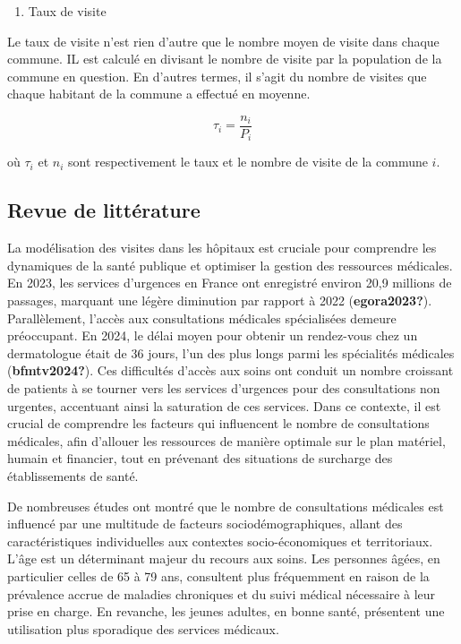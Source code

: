 \documentclass[
]{article}
\providecommand{\tightlist}{%
  \setlength{\itemsep}{0pt}\setlength{\parskip}{0pt}}
\begin{document}
\begin{enumerate}
\def\labelenumi{\arabic{enumi}.}
\setcounter{enumi}{1}
\tightlist
\item
  Taux de visite
\end{enumerate}

Le taux de visite n'est rien d'autre que le nombre moyen de visite dans
chaque commune. IL est calculé en divisant le nombre de visite par la
population de la commune en question. En d'autres termes, il s'agit du
nombre de visites que chaque habitant de la commune a effectué en
moyenne.

\[\tau_i = \frac{n_i}{P_i}\]

où \(\tau_i\) et \(n_i\) sont respectivement le taux et le nombre de
visite de la commune \(i\).

\subsection{Revue de littérature}\label{revue-de-littuxe9rature}

La modélisation des visites dans les hôpitaux est cruciale pour
comprendre les dynamiques de la santé publique et optimiser la gestion
des ressources médicales. En 2023, les services d'urgences en France ont
enregistré environ 20,9 millions de passages, marquant une légère
diminution par rapport à 2022 (\textbf{egora2023?}). Parallèlement,
l'accès aux consultations médicales spécialisées demeure préoccupant. En
2024, le délai moyen pour obtenir un rendez-vous chez un dermatologue
était de 36 jours, l'un des plus longs parmi les spécialités médicales
(\textbf{bfmtv2024?}). Ces difficultés d'accès aux soins ont conduit un
nombre croissant de patients à se tourner vers les services d'urgences
pour des consultations non urgentes, accentuant ainsi la saturation de
ces services. Dans ce contexte, il est crucial de comprendre les
facteurs qui influencent le nombre de consultations médicales, afin
d'allouer les ressources de manière optimale sur le plan matériel,
humain et financier, tout en prévenant des situations de surcharge des
établissements de santé.

De nombreuses études ont montré que le nombre de consultations médicales
est influencé par une multitude de facteurs sociodémographiques, allant
des caractéristiques individuelles aux contextes socio-économiques et
territoriaux. L'âge est un déterminant majeur du recours aux soins. Les
personnes âgées, en particulier celles de 65 à 79 ans, consultent plus
fréquemment en raison de la prévalence accrue de maladies chroniques et
du suivi médical nécessaire à leur prise en charge. En revanche, les
jeunes adultes, en bonne santé, présentent une utilisation plus
sporadique des services médicaux.
\end{document}
